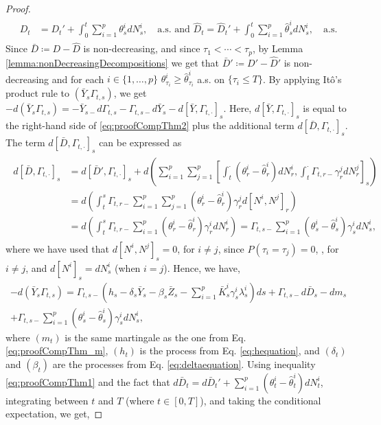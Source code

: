 \documentclass[11pt,a4paper]{article}
\numberwithin{equation}{section}
\theoremstyle{newPlain}
\theoremstyle{newDefinition}
\theoremstyle{newRemark}
\begin{document}
{\begin{proof}
\begin{align}\label{eq:proofCompThm7}
    \begin{aligned}
        D_t &= D_t' + \int_0^t\sum_{i=1}^p\theta_s^idN_s^i,\quad\text{a.s. and }
        \hat{D}_t = \hat{D}_t' + \int_0^t\sum_{i=1}^p\hat{\theta}_s^idN_s^i,\quad\text{a.s.}
    \end{aligned}
\end{align}
Since $\bar{D}\coloneqq D - \hat{D}$ is non-decreasing, and since $\tau_1<\cdots<\tau_p$, by Lemma \ref{lemma:nonDecreasingDecompositions} we get that $\bar{D}' \coloneqq D' - \hat{D}'$ is non-decreasing and for each $i\in\{1,\ldots,p\}$ $\theta_{\tau_i}^i\ge\hat{\theta}_{\tau_i}^i$ a.s. on $\{\tau_i\le T\}$. By applying It\^o's product rule to $(\bar{Y}_s\Gamma_{t,s})$, we get $-d(\bar{Y}_s\Gamma_{t,s}) = -\bar{Y}_{s-}d\Gamma_{t,s}-\Gamma_{t,s-}d\bar{Y}_s - d[\bar{Y},\Gamma_{t,\cdot}]_s$. Here, $d[\bar{Y},\Gamma_{t,\cdot}]_s$ is equal to the right-hand side of \eqref{eq:proofCompThm2} plus the additional term $d[\bar{D}, \Gamma_{t,\cdot}]_s$. The term $d[\bar{D}, \Gamma_{t,\cdot}]_s$ can be expressed as
\begin{align}\label{eq:proofCompThm8}
    \begin{aligned}
        d[\bar{D},\Gamma_{t,\cdot}]_s &= d[\bar{D}',\Gamma_{t,\cdot}]_s + d\left(\sum_{i=1}^p\sum_{j=1}^p\left[\int_t^\cdot(\theta_r^i-\hat{\theta}_r^i)dN_r^i,\int_t^\cdot\Gamma_{t,r-}\gamma_r^jdN_r^j\right]_s\right)\\
	&=d\left(\int_t^s\Gamma_{t,r-}\sum_{i=1}^p\sum_{j=1}^p(\theta_r^i-\hat{\theta}_r^i)\gamma_r^jd[N^i,N^j]_r\right)\\
        &= d\left(\int_t^s\Gamma_{t,r-}\sum_{i=1}^p(\theta_r^i-\hat{\theta}_r^i)\gamma_r^idN_r^i\right)= \Gamma_{t,s-}\sum_{i=1}^p(\theta_s^i-\hat{\theta}_s^i)\gamma_s^idN_s^i,
    \end{aligned}
\end{align}
where we have used that $d[N^i,N^j]_s = 0$, for $i\ne j$, since $P(\tau_i = \tau_j)=0$, , for $i\ne j$, and $d[N^i]_s = dN_s^i$ (when $i=j$). Hence, we have,
\begin{multline}\label{eq:proofCompThm9}
    -d(\bar{Y}_s\Gamma_{t,s}) = \Gamma_{t,s-}\left(h_s - \delta_s\bar{Y}_s - \beta_s\bar{Z}_s-\sum_{i=1}^p\bar{K}_s^i\gamma_s^i\lambda_s^i\right)ds +\Gamma_{t,s-}d\bar{D}_s-dm_s\\
    +\Gamma_{t,s-}\sum_{i=1}^p(\theta_s^i-\hat{\theta}_s^i)\gamma_s^idN_s^i,
\end{multline}
where $(m_t)$ is the same martingale as the one from Eq. \eqref{eq:proofCompThm_m}, $(h_t)$ is the  process from Eq.  \eqref{eq:hequation}, and $(\delta_t)$ and $(\beta_t)$ are the  processes from Eq. \eqref{eq:deltaequation}. Using inequality \eqref{eq:proofCompThm1} and the fact that $d\bar{D}_t = d\bar{D}_t'+\sum_{i=1}^p(\theta_t^i-\hat{\theta}_t^i)dN_t^i$, integrating between $t$ and $T$ (where $t\in[0,T]$), and taking the conditional expectation, we get,

\end{proof}}
\end{document}
